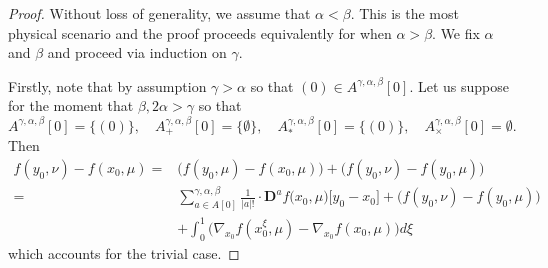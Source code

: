 \documentclass[a4paper,11pt,twoside]{article}
\numberwithin{equation}{section}
\theoremstyle{plain}
\newcommand{\rD}{\mathbf{D}}
\newcommand{\1}{\mathbbm{1}}
\begin{document}
\begin{proof}
		Without loss of generality, we assume that $\alpha<\beta$. This is the most physical scenario and the proof proceeds equivalently for when $\alpha>\beta$. We fix $\alpha$ and $\beta$ and proceed via induction on $\gamma$. 
		
		Firstly, note that by assumption $\gamma>\alpha$ so that $(0)\in A^{\gamma, \alpha, \beta}[0]$. Let us suppose for the moment that $\beta, 2\alpha>\gamma$ so that
		\begin{equation*}
			A^{\gamma, \alpha, \beta}[0] = \Big\{ (0) \Big\}, 
			\quad 
			A_{+}^{\gamma, \alpha, \beta}[0] = \Big\{ \emptyset \Big\}, 
			\quad
			A_{\ast}^{\gamma, \alpha, \beta}[0] = \Big\{ (0) \Big\}, 
			\quad 
			A_{\times}^{\gamma, \alpha, \beta}[0] = \emptyset. 
		\end{equation*}
		Then
		\begin{align*}
			f(y_0, \nu) - f(x_0, \mu) =&  \Big( f(y_0, \mu) - f(x_0, \mu) \Big) + \Big( f(y_0, \nu) - f(y_0, \mu) \Big)
			\\
			=& \sum_{a \in A[0]}^{\gamma, \alpha, \beta} \frac{1}{|a|!} \cdot \rD^af\Big( x_0, \mu \Big)\Big[ y_0 - x_0 \Big] + \Big( f(y_0, \nu) - f(y_0, \mu) \Big)
			\\
			&+ \int_0^1 \Big( \nabla_{x_0} f( x_0^\xi, \mu) - \nabla_{x_0} f( x_0, \mu) \Big) d\xi
		\end{align*}
		which accounts for the trivial case. 
		

\end{proof}
\end{document}
